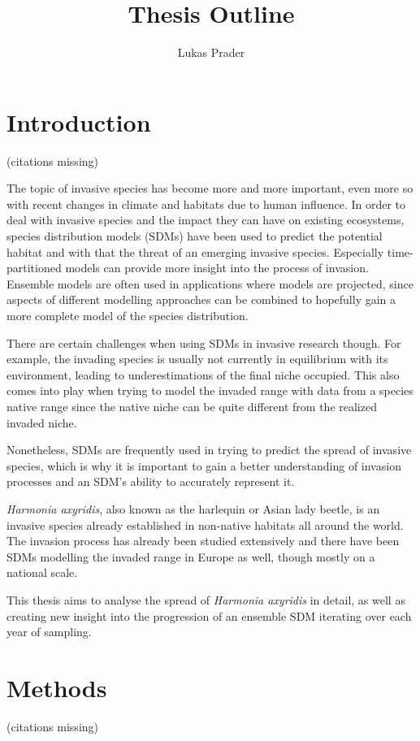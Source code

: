 \documentclass[12pt]{article}
\begin{document}
\title{Thesis Outline}
\author{Lukas Prader}
\date{}
\maketitle

\section{Introduction}
(citations missing)

The topic of invasive species has become more and more important, even more so with recent changes in climate and habitats due to human influence.
In order to deal with invasive species and the impact they can have on existing ecosystems, species distribution models (SDMs) have been used to predict the potential habitat and with that the threat of an emerging invasive species.
Especially time-partitioned models can provide more insight into the process of invasion. 
Ensemble models are often used in applications where models are projected, since aspects of different modelling approaches can be combined to hopefully gain a more complete model of the species distribution. 

There are certain challenges when using SDMs in invasive research though. 
For example, the invading species is usually not currently in equilibrium with its environment, leading to underestimations of the final niche occupied. 
This also comes into play when trying to model the invaded range with data from a species native range since the native niche can be quite different from the realized invaded niche.

Nonetheless, SDMs are frequently used in trying to predict the spread of invasive species, which is why it is important to gain a better understanding of invasion processes and an SDM's ability to accurately represent it.

\textit{Harmonia axyridis}, also known as the harlequin or Asian lady beetle, is an invasive species already established in non-native habitats all around the world.
The invasion process has already been studied extensively and there have been SDMs modelling the invaded range in Europe as well, though mostly on a national scale. 

This thesis aims to analyse the spread of \textit{Harmonia axyridis} in detail, as well as creating new insight into the progression of an ensemble SDM iterating over each year of sampling. 

\newpage
\section{Methods}
(citations missing)
\end{document}
